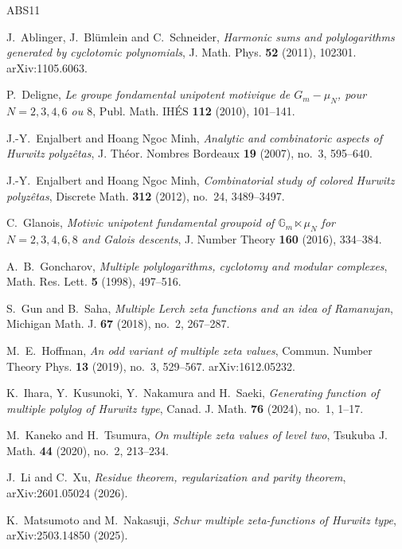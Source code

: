 \documentclass[11pt]{amsart}
\theoremstyle{definition}
\theoremstyle{remark}
\numberwithin{equation}{section}
\begin{document}
\begin{thebibliography}{ABS11}\small

 J.~Ablinger, J.~Bl\"umlein and C.~Schneider, \emph{Harmonic sums and polylogarithms generated by cyclotomic polynomials}, J. Math. Phys. \textbf{52} (2011), 102301. arXiv:1105.6063.

 P.~Deligne, \emph{Le groupe fondamental unipotent motivique de $G_m-\mu_N$, pour $N=2,3,4,6$ ou $8$}, Publ. Math. IH\'ES \textbf{112} (2010), 101--141.

 J.-Y.~Enjalbert and Hoang Ngoc Minh, \emph{Analytic and combinatoric aspects of Hurwitz polyz\^etas}, J. Th\'eor. Nombres Bordeaux \textbf{19} (2007), no.~3, 595--640.

 J.-Y.~Enjalbert and Hoang Ngoc Minh, \emph{Combinatorial study of colored Hurwitz polyz\^etas}, Discrete Math. \textbf{312} (2012), no.~24, 3489--3497.

 C.~Glanois, \emph{Motivic unipotent fundamental groupoid of $\mathbb{G}_m\ltimes\mu_N$ for $N=2,3,4,6,8$ and Galois descents}, J. Number Theory \textbf{160} (2016), 334--384.

 A.~B.~Goncharov, \emph{Multiple polylogarithms, cyclotomy and modular complexes}, Math. Res. Lett. \textbf{5} (1998), 497--516.

 S.~Gun and B.~Saha, \emph{Multiple Lerch zeta functions and an idea of Ramanujan}, Michigan Math. J. \textbf{67} (2018), no.~2, 267--287.

 M.~E.~Hoffman, \emph{An odd variant of multiple zeta values}, Commun. Number Theory Phys. \textbf{13} (2019), no.~3, 529--567. arXiv:1612.05232.

 K.~Ihara, Y.~Kusunoki, Y.~Nakamura and H.~Saeki, \emph{Generating function of multiple polylog of Hurwitz type}, Canad. J. Math. \textbf{76} (2024), no.~1, 1--17.

 M.~Kaneko and H.~Tsumura, \emph{On multiple zeta values of level two}, Tsukuba J. Math. \textbf{44} (2020), no.~2, 213--234.

 J.~Li and C.~Xu, \emph{Residue theorem, regularization and parity theorem}, arXiv:2601.05024 (2026).

 K.~Matsumoto and M.~Nakasuji, \emph{Schur multiple zeta-functions of Hurwitz type}, arXiv:2503.14850 (2025).


\end{thebibliography}
\end{document}
